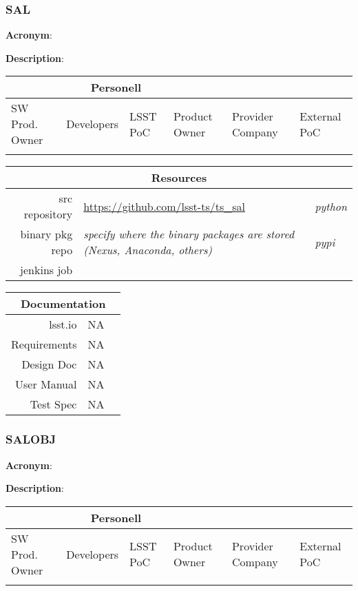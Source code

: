 
\subsubsection{SAL}

\textbf{Acronym}: 

\textbf{Description}:

\begin{longtable}[]{p{2cm}p{2cm}p{2cm}p{2cm}p{2cm}p{2cm}}
\hline
\multicolumn{4}{c}{\textbf{Personell}} \\ \hline
SW Prod. Owner & Developers & LSST PoC   & Product Owner & Provider Company & External PoC \\ \hline
               &            &            &               &                  &              \\ \hline
\end{longtable}

\begin{longtable}[]{rll}
\hline
\multicolumn{3}{c}{\textbf{Resources}} \\ \hline
src repository    & \url{https://github.com/lsst-ts/ts_sal} & \textit{python} \\ \hline
binary pkg repo   & \textit{specify where the binary packages are stored (Nexus, Anaconda, others)} & \textit{pypi}\\ \hline
\hline
jenkins job    & & \\ \hline
\end{longtable}

\begin{longtable}[]{rll}
\hline
\multicolumn{3}{c}{\textbf{Documentation}} \\ \hline
lsst.io & NA & \\ \hline
Requirements & NA & \\ \hline
Design Doc & NA & \\ \hline
User Manual & NA & \\ \hline
Test Spec & NA & \\ \hline
\end{longtable}


\subsubsection{SALOBJ}

\textbf{Acronym}: 

\textbf{Description}:

\begin{longtable}[]{p{2cm}p{2cm}p{2cm}p{2cm}p{2cm}p{2cm}}
\hline
\multicolumn{4}{c}{\textbf{Personell}} \\ \hline
SW Prod. Owner & Developers & LSST PoC   & Product Owner & Provider Company & External PoC \\ \hline
               &            &            &               &                  &              \\ \hline
\end{longtable}


